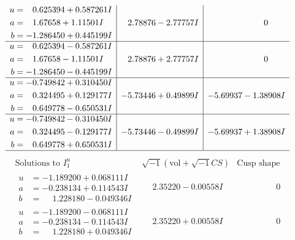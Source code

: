 \documentclass[1p]{elsarticle_modified}
\theoremstyle{definition}
\newcommand{\I}{\sqrt{-1}}
\begin{document}
$$\begin{array}{c|c|c}
\begin{aligned}
u &= \phantom{-}0.625394 + 0.587261 I \\
a &= \phantom{-}1.67658 + 1.11501 I \\
b &= -1.286450 + 0.445199 I\end{aligned}
 & \phantom{-}2.78876 - 2.77757 I & \phantom{-0.000000 } 0 \\ \hline\begin{aligned}
u &= \phantom{-}0.625394 - 0.587261 I \\
a &= \phantom{-}1.67658 - 1.11501 I \\
b &= -1.286450 - 0.445199 I\end{aligned}
 & \phantom{-}2.78876 + 2.77757 I & \phantom{-0.000000 } 0 \\ \hline\begin{aligned}
u &= -0.749842 + 0.310450 I \\
a &= \phantom{-}0.324495 + 0.129177 I \\
b &= \phantom{-}0.649778 - 0.650531 I\end{aligned}
 & -5.73446 + 0.49899 I & -5.69937 - 1.38908 I \\ \hline\begin{aligned}
u &= -0.749842 - 0.310450 I \\
a &= \phantom{-}0.324495 - 0.129177 I \\
b &= \phantom{-}0.649778 + 0.650531 I\end{aligned}
 & -5.73446 - 0.49899 I & -5.69937 + 1.38908 I\\
 \hline 
 \end{array}$$\newpage$$\begin{array}{c|c|c}  
\text{Solutions to }I^u_{1}& \I (\text{vol} + \sqrt{-1}CS) & \text{Cusp shape}\\
 \hline 
\begin{aligned}
u &= -1.189200 + 0.068111 I \\
a &= -0.238134 + 0.114543 I \\
b &= \phantom{-}1.228180 - 0.049346 I\end{aligned}
 & \phantom{-}2.35220 - 0.00558 I & \phantom{-0.000000 } 0 \\ \hline\begin{aligned}
u &= -1.189200 - 0.068111 I \\
a &= -0.238134 - 0.114543 I \\
b &= \phantom{-}1.228180 + 0.049346 I\end{aligned}
 & \phantom{-}2.35220 + 0.00558 I & \phantom{-0.000000 } 0 \\ \hline\begin{aligned}

\end{aligned}
\end{array}$$
\end{document}
